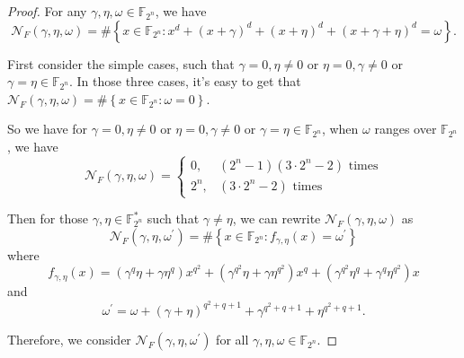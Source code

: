 \documentclass[12 pt]{article}
\def\F{{\mathbb F}}
\begin{document}
\begin{proof}
  For any $ \gamma,\eta,\omega\in\F_{2^n} $, we have
  \[\mathcal{N}_F(\gamma,\eta,\omega)=\#\left\{ x\in\F_{2^n}:x^d+(x+\gamma)^d+(x+\eta)^d+(x+\gamma+\eta)^d=\omega \right\}.\]
  
  First consider the simple cases, such that $ \gamma=0,\eta\ne 0 $ or $ \eta=0,\gamma\ne 0 $ or $ \gamma=\eta\in\F_{2^n} $. 
  In those three cases, it's easy to get that $ \mathcal{N}_F(\gamma,\eta,\omega)=\#\left\{ x\in\F_{2^n}:\omega=0 \right\} $. 
  
  So we have for $ \gamma=0,\eta\ne 0 $ or $ \eta=0,\gamma\ne 0 $ or $ \gamma=\eta\in\F_{2^n} $, when $ \omega $ ranges over 
  $ \F_{2^n} $, we have 
  \begin{equation}\label{eq:N_F_trivil} 
    \mathcal{N}_F(\gamma,\eta,\omega)=\begin{cases}
      0,&(2^n-1)(3\cdot 2^{n}-2)\text{~times}\\
      2^n,&(3\cdot 2^{n}-2) \text{~times}
    \end{cases}
  \end{equation}

  Then for those $ \gamma,\eta\in\F_{2^n}^* $ such that $ \gamma\ne\eta $, 
   we can rewrite $ \mathcal{N}_F(\gamma,\eta,\omega) $ as 
  \[\mathcal{N}_F(\gamma,\eta,\omega^{\prime})=\#\left\{ x\in\F_{2^n}:f_{\gamma,\eta}(x)=\omega^{\prime} \right\}\]
  where 
  \begin{equation}\label{eq:linearized_f}
	f_{\gamma,\eta}(x) =\left( \gamma^q\eta+\gamma\eta^q \right)x^{q^2}+\left( \gamma^{q^2}\eta+\gamma\eta^{q^2} \right)x^q+\left( \gamma^{q^2}\eta^q+\gamma^q\eta^{q^2} \right)x
\end{equation}
  and 
  \[ \omega^{\prime}=\omega+(\gamma+\eta)^{q^2+q+1}+\gamma^{q^2+q+1}+\eta^{q^2+q+1}. \]

  Therefore, we consider $ \mathcal{N}_F(\gamma,\eta,\omega^{\prime}) $ for all $ \gamma,\eta,\omega\in\F_{2^n} $.




\end{proof}
\end{document}
